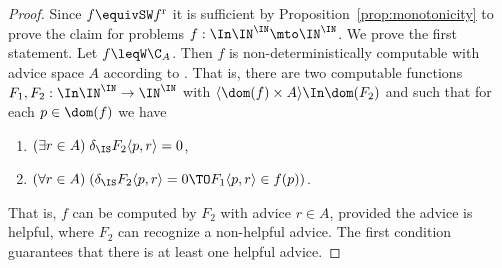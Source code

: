 \documentclass{lmcs}
\def\r{\mathrm{r}}
\begin{document}
\begin{proof}
Since $f\equivSW f^\r$ it is sufficient by Proposition~\ref{prop:monotonicity} to prove the claim for problems $f:\In\IN^\IN\mto\IN^\IN$. We prove the first statement.
Let $f\leqW\C_A$. Then $f$ is non-deterministically computable with advice space $A$
according to \cite[Definition~7.1, Theorem~7.2]{BBP12}.  That is, there are two computable functions $F_1,F_2:\In\IN^\IN\to\IN^\IN$
with $\langle\dom(f)\times A\rangle\In\dom(F_2)$ and such that for each $p\in\dom(f)$ we have
\begin{enumerate}
\item $(\exists r\in A)\;\delta_\IS F_2\langle p,r\rangle=0$,
\item $(\forall r\in A)\;(\delta_\IS F_2\langle p,r\rangle=0\TO F_1\langle p,r\rangle\in f(p))$.
\end{enumerate}
That is, $f$ can be computed by $F_2$ with advice $r\in A$, provided the advice is helpful, where
$F_2$ can recognize a non-helpful advice.
The first condition guarantees that there is at least one helpful advice.


\end{proof}
\end{document}
